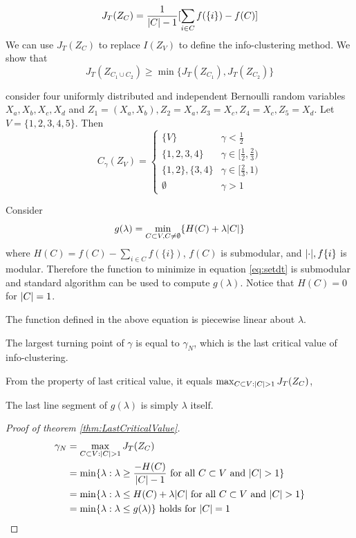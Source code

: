 \documentclass{article}
\begin{document}
\begin{equation}
J_T(Z_C) = \frac{1}{\lvert C\rvert-1} [\sum_{i\in C} f(\{i\}) - f(C)]
\end{equation}
We can use $J_T(Z_C)$ to replace $I(Z_V)$ to define the info-clustering method.
We show that
\begin{equation}
J_T(Z_{C_1\cup C_2}) \geq \min\{ J_T(Z_{C_1}), J_T(Z_{C_2}) \} 
\end{equation}
\begin{example}\label{eg:rand5}
consider four
uniformly distributed and independent Bernoulli random variables $X_a, X_b, X_c, X_d$ and $
Z_1 = (X_a, X_b), Z_2 = X_a, Z_3 = X_c, Z_4 = X_c, Z_5 = X_d$. Let $V = \{1,2,3,4,5\}$.
Then 
\begin{equation*}
C_{\gamma}(Z_V) = \begin{cases}
\{V\} & \gamma < \frac{1}{2} \\
\{1,2,3,4\} & \gamma \in [\frac{1}{2}, \frac{2}{3}) \\
\{1,2\}, \{3,4\} & \gamma \in [\frac{2}{3}, 1) \\
\emptyset & \gamma > 1
\end{cases}
\end{equation*}
\end{example}
Consider
\begin{equation}\label{eq:setdt}
g(\lambda) = \min_{C\subset V, C\neq \emptyset} \{ H(C) + \lambda\lvert C\rvert\}
\end{equation}
where $H(C) = f(C) - \sum_{i\in C} f(\{i\})$, $f(C)$ is submodular, and $\lvert\cdot\rvert, f\{i\}$ is modular.
Therefore the function to minimize in equation \eqref{eq:setdt} is submodular and standard algorithm can be
used to compute $g(\lambda)$.
Notice that $H(C)=0$ for $\lvert C\rvert=1$.

The function defined in the above equation is piecewise linear about $\lambda$.
\begin{theorem}\label{thm:LastCriticalValue}
The largest turning point of $\gamma$ is equal to $\gamma_N$, which is the last critical value of info-clustering.
\end{theorem}
From the property of last critical value, it equals $\max_{C\subset V: \lvert C\rvert>1}J_T(Z_C)$,


The last line segment of $g(\lambda)$ is simply $\lambda$ itself.
\begin{proof}[Proof of theorem \ref{thm:LastCriticalValue}]
\begin{align*}
\gamma_N & = \max_{C\subset V: \lvert C\rvert>1} J_T(Z_C) \\
& = \min\{\lambda : \lambda \geq \frac{-H(C)}{\lvert C\rvert-1} \textrm{ for all $C\subset V$ and $\lvert C\rvert>1$}\} \\
& = \min\{\lambda : \lambda \leq H(C)+\lambda\lvert C\rvert \textrm{ for all $C\subset V$ and $\lvert C\rvert>1$}\} \\
& = \min\{\lambda : \lambda \leq g(\lambda) \} \textrm{ holds for } \lvert C\rvert=1
\end{align*}
\end{proof}
\end{document}
